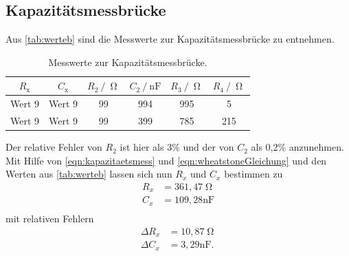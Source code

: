 \subsection{Kapazitätsmessbrücke}
Aus \autoref{tab:werteb} sind die Messwerte zur Kapazitätsmessbrücke zu entnehmen.
\begin{table}[H]
  \centering
  \caption{Messwerte zur Kapazitätsmessbrücke.}
  \label{tab:werteb} 
  \begin{tabular}{c c c c c c}
    \toprule
    $R_{\text{x}}$ & $C_{\text{x}}$ & $R_{\text{2}} \:/\: \upOmega$ & $C_{\text{2}} \:/\: \si{\nano\farad}$ & $R_{\text{3}} \:/\: \upOmega$ & $R_{\text{4}} \:/\: \upOmega$ \\
    \midrule
    Wert 9 & Wert 9 & 99 & 994 & 995 & 5 \\
    Wert 9 & Wert 9 & 99 & 399 & 785 & 215 \\
    \bottomrule
  \end{tabular}
\end{table}
Der relative Fehler von $R_2$ ist hier als 3\% und der von $C_2$ als 0,2\% anzunehmen. Mit Hilfe von \autoref{eqn:kapazitaetsmess} und \autoref{eqn:wheatstoneGleichung} und den
Werten aus \autoref{tab:werteb} lassen sich nun $R_x$ und $C_x$ bestimmen zu
\begin{align*}
  R_x &= 361,47 \upOmega \\
  C_x &= 109,28 \si{\nano\farad} \\
\end{align*}
mit relativen Fehlern
\begin{align*}
  \Delta R_x &= 10,87 \upOmega \\
  \Delta C_x &= 3,29 \si{\nano\farad} . \\
\end{align*}


